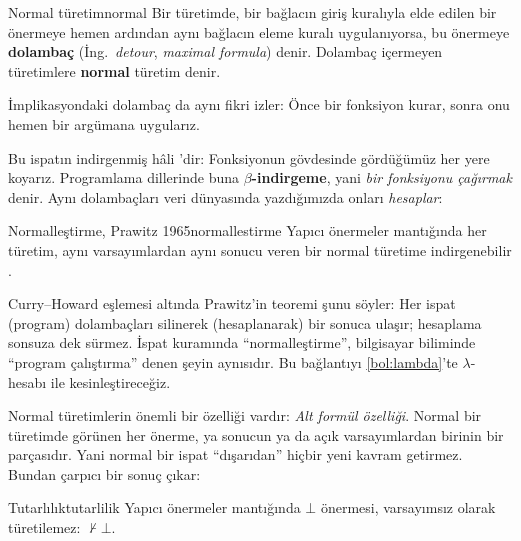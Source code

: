 \begin{tanim}{Normal türetim}{normal}
Bir türetimde, bir bağlacın giriş kuralıyla elde edilen bir önermeye
hemen ardından aynı bağlacın eleme kuralı uygulanıyorsa, bu önermeye
\textbf{dolambaç} (İng.\ \emph{detour}, \emph{maximal formula}) denir.
Dolambaç içermeyen türetimlere \textbf{normal} türetim denir.
\end{tanim}

İmplikasyondaki dolambaç da aynı fikri izler: Önce bir fonksiyon kurar,
sonra onu hemen bir argümana uygularız.


\noindent Bu ispatın indirgenmiş hâli 'dir: Fonksiyonun
gövdesinde  gördüğümüz her yere  koyarız. Programlama
dillerinde buna \textbf{$\beta$-indirgeme}, yani \emph{bir fonksiyonu
çağırmak} denir. Aynı dolambaçları veri dünyasında yazdığımızda
\Lean{} onları \emph{hesaplar}:


\begin{teorem}{Normalleştirme, Prawitz 1965}{normallestirme}
Yapıcı önermeler mantığında her türetim, aynı varsayımlardan aynı sonucu
veren bir normal türetime indirgenebilir \citep{prawitz1965}.
\end{teorem}

\begin{onemlifikir}[Önemli Fikir: Normalleştirme = program çalıştırma]
Curry--Howard eşlemesi altında Prawitz'in teoremi şunu söyler: Her
ispat (program) dolambaçları silinerek (hesaplanarak) bir sonuca ulaşır;
hesaplama sonsuza dek sürmez. İspat kuramında ``normalleştirme'', bilgisayar
biliminde ``program çalıştırma'' denen şeyin aynısıdır. Bu bağlantıyı
\cref{bol:lambda}'te $\lambda$-hesabı ile kesinleştireceğiz.
\end{onemlifikir}

Normal türetimlerin önemli bir özelliği vardır: \emph{Alt formül özelliği}.
Normal bir türetimde görünen her önerme, ya sonucun ya da açık
varsayımlardan birinin bir parçasıdır. Yani normal bir ispat ``dışarıdan''
hiçbir yeni kavram getirmez. Bundan çarpıcı bir sonuç çıkar:

\begin{teorem}{Tutarlılık}{tutarlilik}
Yapıcı önermeler mantığında $\bot$ önermesi, varsayımsız olarak
türetilemez: $\nvdash \bot$.
\end{teorem}

